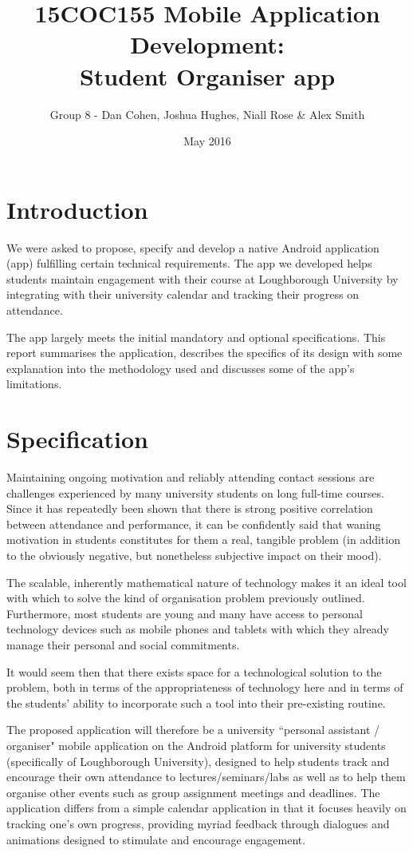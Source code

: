 \documentclass{article}
\title{15COC155 Mobile Application Development: \\
    Student Organiser app}
\author{Group 8 - Dan Cohen, Joshua Hughes, Niall Rose \& Alex Smith}
\date{May 2016}
\begin{document}
\maketitle

\tableofcontents
\newpage

\section{Introduction}
We were asked to propose, specify and develop a native Android application (app) fulfilling certain technical requirements. The app we developed helps students maintain engagement with their course at Loughborough University by integrating with their university calendar and tracking their progress on attendance.

The app largely meets the initial mandatory and optional specifications. This report summarises the application, describes the specifics of its design with some explanation into the methodology used and discusses some of the app's limitations.

\section{Specification}
Maintaining ongoing motivation and reliably attending contact sessions are challenges experienced by many university students on long full-time courses. Since it has repeatedly been shown that there is strong positive correlation between attendance and performance, it can be confidently said that waning motivation in students constitutes for them a real, tangible problem (in addition to the obviously negative, but nonetheless subjective impact on their mood). 

The scalable, inherently mathematical nature of technology makes it an ideal tool with which to solve the kind of organisation problem previously outlined. Furthermore, most students are young and many have access to personal technology devices such as mobile phones and tablets with which they already manage their personal and social commitments. 

It would seem then that there exists space for a technological solution to the problem, both in terms of the appropriateness of technology here and in terms of the students' ability to incorporate such a tool into their pre-existing routine.

The proposed application will therefore be a university ``personal assistant / organiser" mobile application on the Android platform for university students (specifically of Loughborough University), designed to help students track and encourage their own attendance to lectures/seminars/labs as well as to help them organise other events such as group assignment meetings and deadlines. The application differs from a simple calendar application in that it focuses heavily on tracking one's own progress, providing myriad feedback through dialogues and animations designed to stimulate and encourage engagement.
\end{document}
